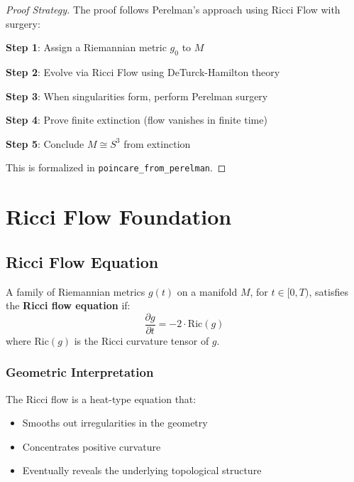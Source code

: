 \begin{proof}[Proof Strategy]
The proof follows Perelman's approach using Ricci Flow with surgery:

\textbf{Step 1}: Assign a Riemannian metric $g_0$ to $M$

\textbf{Step 2}: Evolve via Ricci Flow using DeTurck-Hamilton theory

\textbf{Step 3}: When singularities form, perform Perelman surgery

\textbf{Step 4}: Prove finite extinction (flow vanishes in finite time)

\textbf{Step 5}: Conclude $M \cong S^3$ from extinction

This is formalized in \texttt{poincare\_from\_perelman}.
\end{proof}

\chapter{Ricci Flow Foundation}
\label{chap:ricci_flow_foundation}

\section{Ricci Flow Equation}

\begin{definition}
\leanok
A family of Riemannian metrics $g(t)$ on a manifold $M$, for $t \in [0,T)$, satisfies the \textbf{Ricci flow equation} if:
\[
\frac{\partial g}{\partial t} = -2 \cdot \text{Ric}(g)
\]
where $\text{Ric}(g)$ is the Ricci curvature tensor of $g$.
\end{definition}

\subsection{Geometric Interpretation}

The Ricci flow is a heat-type equation that:
\begin{itemize}
\item Smooths out irregularities in the geometry
\item Concentrates positive curvature
\item Eventually reveals the underlying topological structure
\end{itemize}

